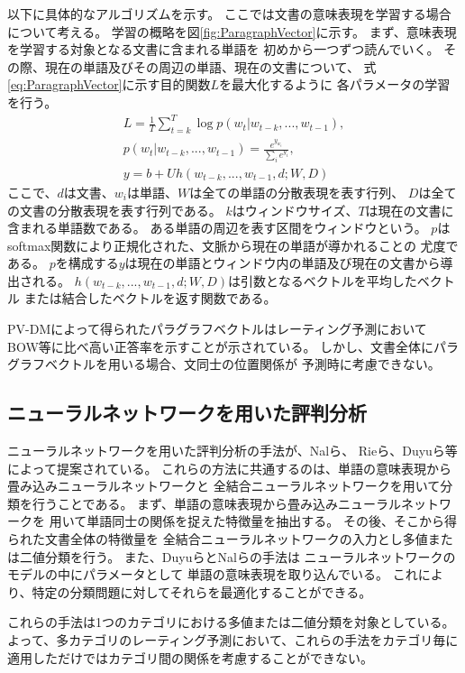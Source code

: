 以下に具体的なアルゴリズムを示す。
ここでは文書の意味表現を学習する場合について考える。
学習の概略を図\ref{fig:ParagraphVector}に示す。
まず、意味表現を学習する対象となる文書に含まれる単語を
初めから一つずつ読んでいく。
その際、現在の単語及びその周辺の単語、現在の文書について、
式\ref{eq:ParagraphVector}に示す目的関数$L$を最大化するように
各パラメータの学習を行う。
\begin{gather}
  L = \frac{1}{T} \sum^{T}_{t = k} \log p(w_t | w_{t-k}, ..., w_{t-1}),
    \label{eq:ParagraphVector} \\
  p(w_t | w_{t-k}, ..., w_{t-1}) = \frac{e^{y_{w_t}}}{\sum_i e^{y_i}},
    \nonumber \\
  y = b + Uh(w_{t-k}, ..., w_{t-1}, d; W, D) \nonumber
\end{gather}
ここで、$d$は文書、$w_i$は単語、$W$は全ての単語の分散表現を表す行列、
$D$は全ての文書の分散表現を表す行列である。
$k$はウィンドウサイズ、$T$は現在の文書に含まれる単語数である。
ある単語の周辺を表す区間をウィンドウという。
$p$はsoftmax関数により正規化された、文脈から現在の単語が導かれることの
尤度である。
$p$を構成する$y$は現在の単語とウィンドウ内の単語及び現在の文書から導出される。
$h(w_{t-k}, ..., w_{t-1}, d; W, D)$は引数となるベクトルを平均したベクトル
または結合したベクトルを返す関数である。

PV-DMによって得られたパラグラフベクトルはレーティング予測において
BOW等に比べ高い正答率を示すことが示されている。
しかし、文書全体にパラグラフベクトルを用いる場合、文同士の位置関係が
予測時に考慮できない。


\subsection{ニューラルネットワークを用いた評判分析}

ニューラルネットワークを用いた評判分析の手法が、Nalら\cite{nal14}、
Rieら\cite{rie14}、Duyuら\cite{duyu15}等によって提案されている。
これらの方法に共通するのは、単語の意味表現から畳み込みニューラルネットワークと
全結合ニューラルネットワークを用いて分類を行うことである。
まず、単語の意味表現から畳み込みニューラルネットワークを
用いて単語同士の関係を捉えた特徴量を抽出する。
その後、そこから得られた文書全体の特徴量を
全結合ニューラルネットワークの入力とし多値または二値分類を行う。
また、Duyuら\cite{duyu15}とNalら\cite{nal14}の手法は
ニューラルネットワークのモデルの中にパラメータとして
単語の意味表現を取り込んでいる。
これにより、特定の分類問題に対してそれらを最適化することができる。

これらの手法は1つのカテゴリにおける多値または二値分類を対象としている。
よって、多カテゴリのレーティング予測において、これらの手法をカテゴリ毎に
適用しただけではカテゴリ間の関係を考慮することができない。
